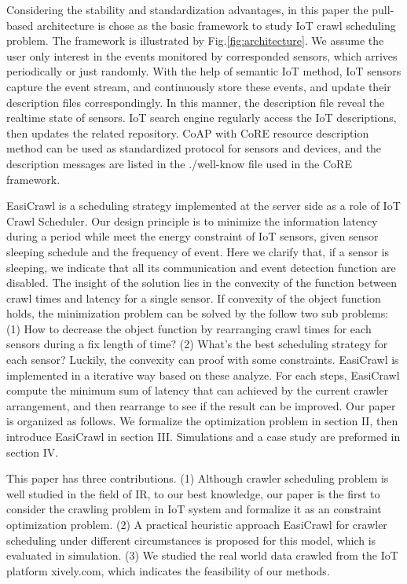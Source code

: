\documentclass[conference]{IEEEtran}
\begin{document}
Considering the stability and standardization advantages, in this paper the pull-based architecture is chose as the basic framework to study IoT crawl scheduling problem. The framework is illustrated by Fig.\ref{fig:architecture}. 
We assume the user only interest in the events monitored by corresponded sensors, which arrives periodically or just randomly. With the help of semantic IoT method, IoT sensors capture the event stream, and continuously store these events, and update their description files correspondingly. In this manner, the description file reveal the realtime state of sensors. IoT search engine regularly access the IoT descriptions, then updates the related repository. CoAP with CoRE resource description method can be used as standardized protocol for sensors and devices, and the description messages are listed in the ./well-know file used in the CoRE framework. 


EasiCrawl is a scheduling strategy implemented at the server side as a role of IoT Crawl Scheduler. Our design principle is to minimize the information latency during  a period while meet the energy constraint of IoT sensors, given sensor sleeping schedule and the frequency of event. Here we clarify that, if a sensor is sleeping, we indicate that all its communication and event detection function are disabled.
The insight of the solution lies in the convexity of the function between crawl times and latency for a single sensor. If convexity of the object function holds, the minimization problem can be solved by the follow two sub problems: (1) How to decrease the object function by rearranging crawl times for each sensors during a fix length of time? (2) What's the best scheduling strategy for each sensor? Luckily, the convexity can proof with some constraints. EasiCrawl is implemented in a iterative way based on these analyze. For each steps, EasiCrawl compute the minimum sum of latency that can achieved by the current crawler arrangement, and then rearrange to see if the result can be improved.
Our paper is organized as follows. We formalize the optimization problem in section II, then introduce EasiCrawl in section III. Simulations and a case study are preformed in section IV. 

This paper has three contributions.
(1) Although crawler scheduling problem is well studied in the field of IR, to our best knowledge, our paper is the first to consider the crawling problem in IoT system and formalize it as an constraint optimization problem.
(2) A practical heuristic approach EasiCrawl for crawler scheduling under different circumstances is proposed for this model, which is evaluated in simulation.
(3) We studied the real world data crawled from the IoT platform xively.com, which indicates the feasibility of our methods.
\end{document}
